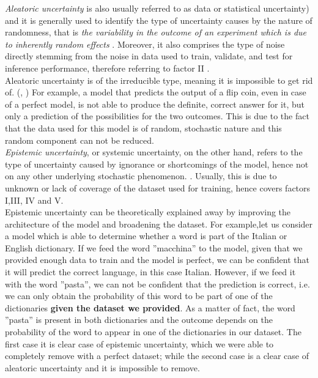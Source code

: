 \textit{Aleatoric uncertainty} is also usually referred to as data or statistical uncertainty) and it is generally used to identify the type of uncertainty causes by the nature of randomness, that is \textit{ the variability in the outcome of an experiment which is due to inherently random effects} \cite{Separation_uncer}. Moreover, it also comprises the type of noise directly stemming from the noise in data used to train, validate, and test for inference performance, therefore referring to factor II \cite{gawlikowski2021survey} \cite{DBLP:journals/corr/abs-1811-01412}.  \\
Aleatoric uncertainty is of the irreducible type, meaning it is impossible to get rid of. (\cite{DBLP:journals/corr/KendallG17}, \cite{Separation_uncer}) For example, a model that predicts the output of a flip coin, even in case of a perfect model, is not able to produce the definite, correct answer for it, but only a prediction of the possibilities for the two outcomes. This is due to the fact that the data used for this model is of random, stochastic nature and this random component can not be reduced. \cite{Separation_uncer}\\
\textit{Epistemic uncertainty}, or systemic uncertainty, on the other hand, refers to the type of uncertainty caused by ignorance or shortcomings of the model, hence not on any other underlying stochastic phenomenon. \cite{DBLP:journals/corr/abs-1811-01412}. Usually, this is due to unknown or lack of coverage of the dataset used for training, hence covers factors I,III, IV and V. \\
Epistemic uncertainty can be theoretically explained away by improving the architecture of the model and broadening the dataset.
For example,let us consider a model which is able to determine whether a word is part of the Italian or English dictionary. If we feed the word ''macchina'' to the model, given that we provided enough data to train and the model is perfect, we can be confident that it will predict the correct language, in this case Italian. However, if we feed it with the word ''pasta'', we can not be confident that the prediction is correct, i.e. we can only obtain the probability of this word to be part of one of the dictionaries \textbf{given the dataset we provided}. As a matter of fact, the word ''pasta'' is present in both dictionaries and the outcome depends on the probability of the word to appear in one of the dictionaries in our dataset. The first case it is clear case of epistemic uncertainty, which we were able to completely remove with a perfect dataset; while the second case is a clear case of aleatoric uncertainty and it is impossible to remove. 
